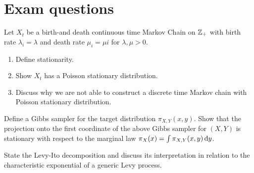 \documentclass{article}
\begin{document}
	 \section{Exam questions}
	 \begin{exercise}
	 	Let $X_{t}$ be a birth-and death continuous time Markov Chain on $\mathbb{Z}_+$ with birth rate $\lambda_{i}=\lambda$ and death rate $\mu_{i}=\mu i$ for $\lambda,\mu>0$.
	 	\begin{enumerate}
	 		\item Define stationarity.
	 		\item Show $X_{t}$ has a Poisson stationary distribution.
	 		\item Discuss why we are not able to construct a discrete time Markov chain with Poisson stationary distribution.
	 	\end{enumerate}
	 \end{exercise}
	 \begin{exercise}
	 	Define a Gibbs sampler for the target distribution $\pi_{X,Y}(x,y)$. Show that the projection onto the first coordinate of the above Gibbs sampler for $(X,Y)$ is stationary with respect to the marginal law $\pi_{X}(x)=\int\pi_{X,Y}(x,y)\mathop{}\!\mathrm{d} y$.
	 \end{exercise}
	 \begin{exercise}
	 	State the Levy-Ito decomposition and discuss its interpretation in relation to the characteristic exponential of a generic Levy process.
	 \end{exercise}
\end{document}

